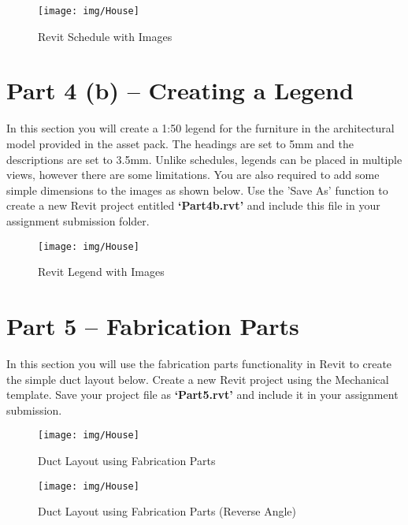 \begin{figure}[h]
	\centering
	\texttt{[image: img/House]}
	\caption{Revit Schedule with Images}
	\label{fig:ScheduleWithImages}
\end{figure}





\section*{Part 4 (b) – Creating a Legend}
In this section you will create a 1:50 legend for the furniture in the architectural model provided in the asset pack. The headings are set to 5mm and the descriptions are set to 3.5mm. Unlike schedules, legends can be placed in multiple views, however there are some limitations. You are also required to add some simple dimensions to the images as shown below. Use the 'Save As' function to create a new Revit project entitled \textbf{‘Part4b.rvt’} and include this file in your assignment submission folder.


\begin{figure}[h]
	\centering
	\texttt{[image: img/House]}
	\caption{Revit Legend with Images}
	\label{fig:RevitLegend}
\end{figure}


\newpage

\section*{Part 5 – Fabrication Parts}
In this section you will use the fabrication parts functionality in Revit to create the simple duct layout below. Create a new Revit project using the Mechanical template. Save your project file as \textbf{‘Part5.rvt’} and include it in your assignment submission.

\begin{figure}[h]
	\centering
	\texttt{[image: img/House]}
	\caption{Duct Layout using Fabrication Parts}
	\label{fig:FabParts}
\end{figure}


\begin{figure}[h]
	\centering
	\texttt{[image: img/House]}
	\caption{Duct Layout using Fabrication Parts (Reverse Angle)}
	\label{fig:FabPartsReverse}
\end{figure}


